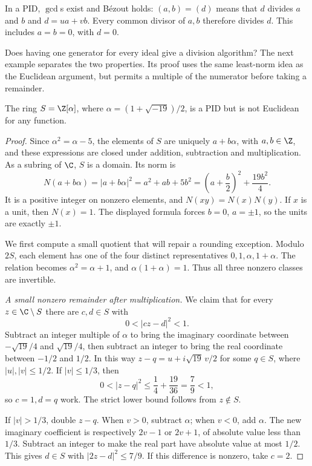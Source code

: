 In a PID, $\gcd$s exist and Bézout holds: $(a,b)=(d)$ means that $d$ divides $a$ and $b$ and $d=ua+vb$. Every common divisor of $a,b$ therefore divides $d$. This includes $a=b=0$, with $d=0$.

Does having one generator for every ideal give a division algorithm?
The next example separates the two properties. Its proof uses the same
least-norm idea as the Euclidean argument, but permits a multiple of the
numerator before taking a remainder.

\begin{proposition}\label{prop:pid-not-euclidean}
The ring $S=\Z[\alpha]$, where
$\alpha=(1+\sqrt{-19})/2$, is a PID but is not Euclidean for any function.
\end{proposition}
\begin{proof}
Since $\alpha^2=\alpha-5$, the elements of $S$ are uniquely
$a+b\alpha$, with $a,b\in\Z$, and these expressions are closed under
addition, subtraction and multiplication. As a subring of $\C$, $S$ is
a domain. Its norm is
\[
N(a+b\alpha)=|a+b\alpha|^2
=a^2+ab+5b^2
=\left(a+\frac b2\right)^2+\frac{19b^2}{4}.
\]
It is a positive integer on nonzero elements, and $N(xy)=N(x)N(y)$.
If $x$ is a unit, then $N(x)=1$. The displayed formula forces
$b=0$, $a=\pm1$, so the units are exactly $\pm1$.

We first compute a small quotient that will repair a rounding exception.
Modulo $2S$, each element has one of the four distinct representatives
$0,1,\alpha,1+\alpha$. The relation becomes
$\alpha^2=\alpha+1$, and
$\alpha(1+\alpha)=1$. Thus all three nonzero classes are invertible.

\emph{A small nonzero remainder after multiplication.}
We claim that for every $z\in\C\setminus S$ there are $c,d\in S$ with
\[
0<|cz-d|^2<1.
\]
Subtract an integer multiple of $\alpha$ to bring the imaginary
coordinate between $-\sqrt{19}/4$ and $\sqrt{19}/4$, then subtract
an integer to bring the real coordinate between $-1/2$ and $1/2$.
In this way $z-q=u+i\sqrt{19}\,v/2$ for some $q\in S$, where
$|u|,|v|\le1/2$. If $|v|\le1/3$, then
\[
0<|z-q|^2\le\frac14+\frac{19}{36}=\frac79<1,
\]
so $c=1,d=q$ work. The strict lower bound follows from $z\notin S$.

If $|v|>1/3$, double $z-q$. When $v>0$, subtract $\alpha$;
when $v<0$, add $\alpha$. The new imaginary coefficient is respectively
$2v-1$ or $2v+1$, of absolute value less than $1/3$.
Subtract an integer to make the real part have absolute value at most
$1/2$. This gives $d\in S$ with $|2z-d|^2\le7/9$.
If this difference is nonzero, take $c=2$.


\end{proof}
